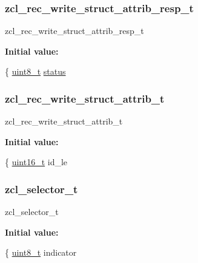 \subsubsection{\texorpdfstring{zcl\+\_\+rec\+\_\+write\+\_\+struct\+\_\+attrib\+\_\+resp\+\_\+t}{zcl\_rec\_write\_struct\_attrib\_resp\_t}}
{\footnotesize\ttfamily zcl\+\_\+rec\+\_\+write\+\_\+struct\+\_\+attrib\+\_\+resp\+\_\+t}

{\bfseries Initial value\+:}
\begin{DoxyCode}
\{
   \hyperlink{group__hal__dos_gae1affc9ca37cfb624959c866a73f83c2}{uint8\_t}       \hyperlink{group__xbee__atcmd_gade818037fd6c985038ff29656089758d}{status}
\end{DoxyCode}
\mbox{\label{group__zcl_ga0bcadc9c7f337bea7b7eaf1ec6dd0a28}} 
\subsubsection{\texorpdfstring{zcl\+\_\+rec\+\_\+write\+\_\+struct\+\_\+attrib\+\_\+t}{zcl\_rec\_write\_struct\_attrib\_t}}
{\footnotesize\ttfamily zcl\+\_\+rec\+\_\+write\+\_\+struct\+\_\+attrib\+\_\+t}

{\bfseries Initial value\+:}
\begin{DoxyCode}
\{
   \hyperlink{group__hal__dos_ga5a8b2dc9e45a9ee81a94ef304fb62505}{uint16\_t}        id\_le
\end{DoxyCode}
\mbox{\label{group__zcl_ga38527c36b75dbd4dadd7aec7eb9b8c6d}} 
\subsubsection{\texorpdfstring{zcl\+\_\+selector\+\_\+t}{zcl\_selector\_t}}
{\footnotesize\ttfamily zcl\+\_\+selector\+\_\+t}

{\bfseries Initial value\+:}
\begin{DoxyCode}
\{
   \hyperlink{group__hal__dos_gae1affc9ca37cfb624959c866a73f83c2}{uint8\_t} indicator
\end{DoxyCode}


